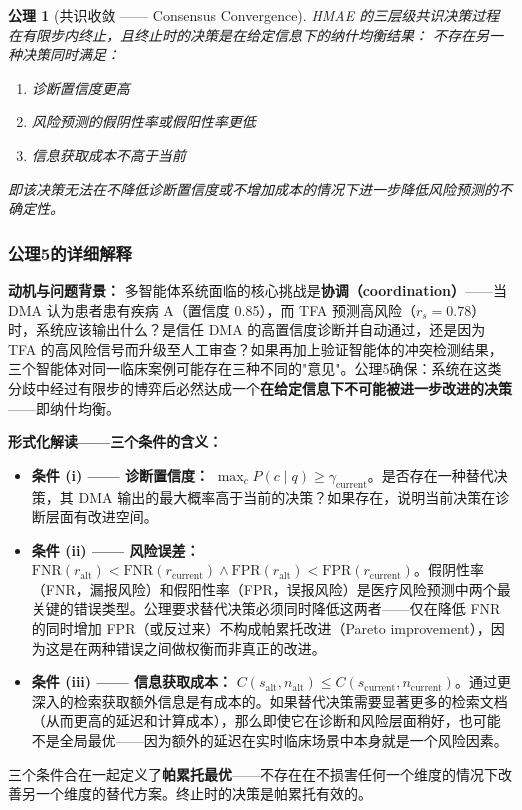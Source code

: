 \documentclass[11pt,a4paper]{ctexart}
\newtheorem{axiom}{公理}[section]
\theoremstyle{remark}
\begin{document}
\begin{axiom}[共识收敛 —— Consensus Convergence]
\label{ax:consensus}
HMAE 的三层级共识决策过程在有限步内终止，且终止时的决策是在给定信息下的纳什均衡结果：
不存在另一种决策同时满足：
\begin{enumerate}[nosep]
\item[(i)] 诊断置信度更高
\item[(ii)] 风险预测的假阴性率或假阳性率更低
\item[(iii)] 信息获取成本不高于当前
\end{enumerate}
即该决策无法在不降低诊断置信度或不增加成本的情况下进一步降低风险预测的不确定性。
\end{axiom}

\subsubsection{公理5的详细解释}

\textbf{动机与问题背景：} 多智能体系统面临的核心挑战是\textbf{协调（coordination）}——当 DMA 认为患者患有疾病 A（置信度 0.85），而 TFA 预测高风险（$r_s=0.78$）时，系统应该输出什么？是信任 DMA 的高置信度诊断并自动通过，还是因为 TFA 的高风险信号而升级至人工审查？如果再加上验证智能体的冲突检测结果，三个智能体对同一临床案例可能存在三种不同的"意见"。公理5确保：系统在这类分歧中经过有限步的博弈后必然达成一个\textbf{在给定信息下不可能被进一步改进的决策}——即纳什均衡。

\textbf{形式化解读——三个条件的含义：}
\begin{itemize}[nosep]
\item \textbf{条件 (i) —— 诊断置信度：} $\max_c P(c \mid q) \geq \gamma_{\text{current}}$。是否存在一种替代决策，其 DMA 输出的最大概率高于当前的决策？如果存在，说明当前决策在诊断层面有改进空间。
\item \textbf{条件 (ii) —— 风险误差：} $\text{FNR}(r_{\text{alt}}) < \text{FNR}(r_{\text{current}}) \land \text{FPR}(r_{\text{alt}}) < \text{FPR}(r_{\text{current}})$。假阴性率（FNR，漏报风险）和假阳性率（FPR，误报风险）是医疗风险预测中两个最关键的错误类型。公理要求替代决策必须同时降低这两者——仅在降低 FNR 的同时增加 FPR（或反过来）不构成帕累托改进（Pareto improvement），因为这是在两种错误之间做权衡而非真正的改进。
\item \textbf{条件 (iii) —— 信息获取成本：} $C(s_{\text{alt}}, n_{\text{alt}}) \leq C(s_{\text{current}}, n_{\text{current}})$。通过更深入的检索获取额外信息是有成本的。如果替代决策需要显著更多的检索文档（从而更高的延迟和计算成本），那么即使它在诊断和风险层面稍好，也可能不是全局最优——因为额外的延迟在实时临床场景中本身就是一个风险因素。
\end{itemize}
三个条件合在一起定义了\textbf{帕累托最优}——不存在在不损害任何一个维度的情况下改善另一个维度的替代方案。终止时的决策是帕累托有效的。
\end{document}
